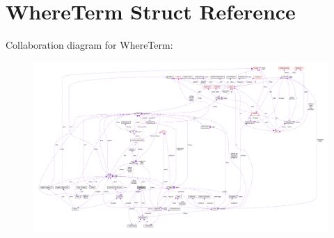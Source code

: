 \hypertarget{struct_where_term}{\section{Where\-Term Struct Reference}
\label{struct_where_term}
}


Collaboration diagram for Where\-Term\-:\nopagebreak
\begin{figure}[H]
\begin{center}
\leavevmode
\includegraphics[width=350pt]{struct_where_term__coll__graph}
\end{center}
\end{figure}
